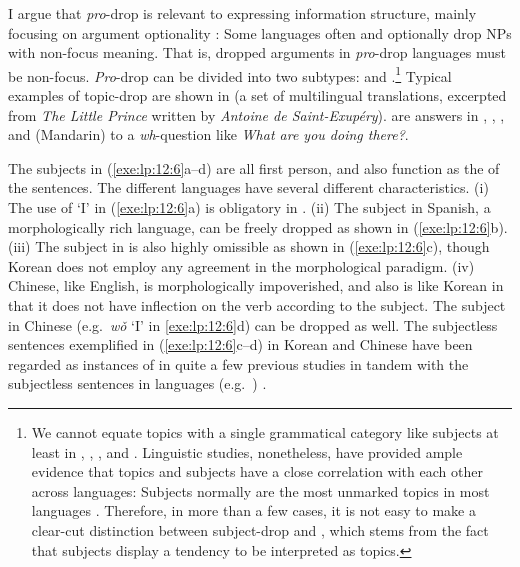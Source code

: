 I argue that \textit{pro}-drop is relevant to expressing information
structure, mainly focusing on argument optionality
 \citep{saleem:10,saleem:bender:10}: Some
languages often and optionally drop NPs with non-focus meaning. That
is, dropped arguments in \textit{pro}-drop languages must be
non-focus.  \textit{Pro}-drop can be divided into two subtypes:
 and .\footnote{We cannot equate
  topics with a single grammatical category like subjects at least in
  , , , and
  . Linguistic studies, nonetheless, have provided ample
  evidence that topics and subjects have a close correlation with each
  other across languages: Subjects normally are the most unmarked
  topics in most languages
  \citep{lambrecht:96,erteschik:07}. Therefore, in more than a few
  cases, it is not easy to make a clear-cut distinction between
  subject-drop and , which stems from the fact that
  subjects display a tendency to be interpreted as topics.}  Typical
examples of topic-drop are shown in  (a set of
multilingual translations, excerpted from \textit{The Little Prince}
written by \textit{Antoine de Saint-Exup{\'e}ry}). 
are answers in , , , and
(Mandarin)  to a \textit{wh}-question like \textit{What
  are you doing there?}.



\noindent The subjects in (\ref{exe:lp:12:6}a--d) are all first person,
and also function as the  of the sentences. The different
languages have several different characteristics.  (i) The use of `I'
in (\ref{exe:lp:12:6}a) is obligatory in .  (ii) The
subject in Spanish, a morphologically rich language, can be freely
dropped as shown in (\ref{exe:lp:12:6}b). (iii) The subject in
 is also highly omissible as shown in
(\ref{exe:lp:12:6}c), though Korean does not employ any agreement in
the morphological paradigm. (iv) Chinese, like English, is
morphologically impoverished, and also is like Korean in that it does
not have inflection on the verb according to the subject. The subject
in Chinese (e.g.\ \textit{w\v{o}} `I' in \ref{exe:lp:12:6}d) can be
dropped as well.  The subjectless sentences exemplified in
(\ref{exe:lp:12:6}c--d) in Korean and Chinese have been regarded as
instances of  in quite a few previous studies in
tandem with the subjectless sentences in  languages
(e.g.\ )
\citep{li:thompson:76,huang:84,yang:02,alonso:etal:02}.


